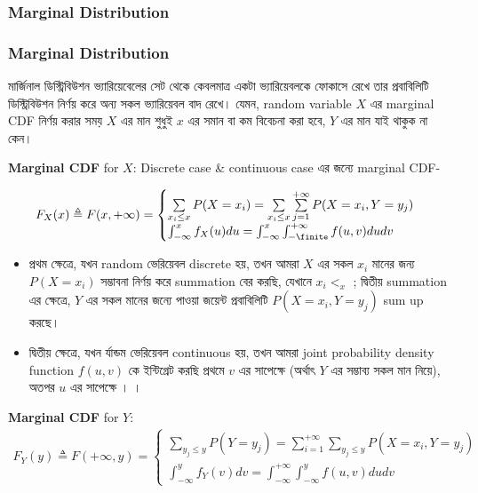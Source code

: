 \documentclass[graybox, envcountchap, twocolumn]{styles/svmult}
\begin{document}
\subsubsection{Marginal Distribution}
\subsubsection{Marginal Distribution} {\bengalifont মার্জিনাল ডিস্ট্রিবিউশন ভ্যারিয়েবেলের সেট থেকে কেবলমাত্র একটা ভ্যারিয়েবলকে ফোকাসে রেখে তার প্রবাবিলিটি ডিস্ট্রিবিউশন নির্ণয় করে অন্য সকল ভ্যারিয়েবল বাদ রেখে।  যেমন, random variable $X$ এর marginal CDF নির্ণয় করার সময় $X$ এর মান শুধুই $x$ এর সমান বা কম বিবেচনা করা হবে, $Y$ এর মান যাই  থাকুক না কেন।  }

\textbf{Marginal CDF} for $X$:
{\bengalifont Discrete case & continuous case এর জন্যে marginal  CDF-  }

\begin{equation}\begin{split}
F_X(x) \triangleq F(x,+\infty) = 
\begin{cases}
\sum\limits_{x_i \leq x} P(X=x_i) = \sum\limits_{x_i \leq x} \sum\limits_{j=1}^{+\infty} P(X=x_i,Y=y_j) \\
\int_{-\infty}^{x} f_X(u)du = \int_{-\infty}^{x} \int_{-\finite}^{+\infty} f(u, v) du dv
\end{cases}
\end{split}\end{equation}
\begin{itemize}
    \item {\bengalifont প্রথম ক্ষেত্রে, যখন random  ভেরিয়েবল discrete হয়, তখন আমরা $X$ এর সকল  $x_i$ মানের জন্য $P(X=x_i)$ সম্ভাবনা নির্ণয় করে summation বের করছি, যেখানে $x_i <_ x $ ; দ্বিতীয় summation এর ক্ষেত্রে, $Y$ এর সকল মানের জন্যে পাওয়া জয়েন্ট প্রবাবিলিটি  $P(X=x_i,Y=y_j)$ sum up  করছে।   }
    \item {\bengalifont দ্বিতীয় ক্ষেত্রে, যখন র্যান্ডম ভেরিয়েবল continuous হয়, তখন আমরা joint probability  density function $f(u,v)$ কে ইন্টিগ্রেট করছি প্রথমে $v$ এর সাপেক্ষে (অর্থাৎ $Y$ এর সম্ভাব্য সকল মান নিয়ে), অতপর $u$ এর সাপেক্ষে । ।}
\end{itemize}

\textbf{Marginal CDF} for $Y$:
\begin{equation}\begin{split}
F_Y(y) \triangleq F(+\infty, y) = 
\begin{cases}
\sum\limits_{y_j \leq y} P(Y=y_j) = \sum\limits_{i=1}^{+\infty} \sum\limits_{y_j \leq y} P(X=x_i,Y=y_j) \\
\int_{-\infty}^{y} f_Y(v) dv = \int_{-\infty}^{+\infty} \int_{-\infty}^{y} f(u, v) du dv
\end{cases}
\end{split}\end{equation}
\end{document}
